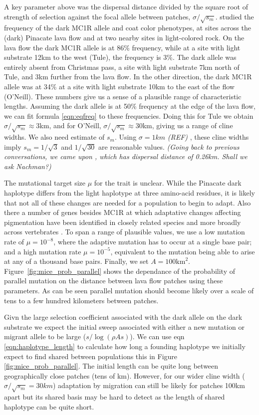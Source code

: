 \documentclass{article}
\newcommand{\gc}[1]{{\it\color{green}(#1)} }
\newcommand{\plr}[1]{{\it\color{blue}(#1)}}
\begin{document}
A key parameter above was the dispersal distance divided by the square root of strength of selection against the focal allele between patches, $\sigma/\sqrt{s_m}$. 
\citep{hoekstra2004ecological} studied the frequency of the dark MC1R allele and coat color phenotypes, 
at sites across the (dark) Pinacate lava flow and at two nearby sites in light-colored rock.
On the lava flow the dark MC1R allele is at 86\% frequency,
while at a site with light substrate 12km to the west (Tule), the frequency is 3\%.
The dark allele was entirely absent from Christmas pass, a site with light substrate 7km north of Tule, and 3km further from the lava flow.
In the other direction, the dark MC1R allele was at 34\% at a site with light substrate 10km to the east of the flow (O'Neill).
These numbers give us a sense of a plausible range of characteristic lengths.
Assuming the dark allele is at 50\% frequency at the edge of the lava flow, 
we can fit formula \eqref{eqn:eqfreq} to these frequencies.
Doing this for Tule we obtain $\sigma/\sqrt{s_m} \approx 3$km, 
and for O'Neill, $\sigma/\sqrt{s_m} \approx 30$km, giving us a range of cline widths. 
We also need estimate of $s_m$. 
Using $\sigma=1km$ \gc{REF}, these cline widths imply $s_m=1/\sqrt{3}$ and
$1/\sqrt{30}$ are reasonable values.
\plr{Going back to previous conversations, we came upon \citet{mullen2008natural}, 
which has dispersal distance of 0.26km.  Shall we ask Nachman?}

The mutational target size $\mu$ for the trait is unclear. 
While the Pinacate dark haplotype differs from the light haplotype at three amino-acid residues,
it is likely that not all of these changes are needed for a population to begin to  adapt. 
Also there a number of genes besides MC1R at which adaptative changes affecting pigmentation 
have been identified in closely related species and more broadly across vertebrates \citep{REF}.
To span a range of plausible values, we use a low mutation rate of $\mu= 10^{-8}$, 
where the adaptive mutation has to occur at a single base pair; 
and a high mutation rate $\mu= 10^{-5}$, equivalent to the mutation
being able to arise at any of a thousand base pairs.  
Finally, we set $A=100\text{km}^2$.
Figure~\ref{fig:mice_prob_parallel} shows the dependance of the probability
of parallel mutation on the distance between lava flow patches using these parameters. 
As can be seen parallel mutation should become
likely over a scale of tens to a few hundred kilometers between patches. 

Givn the large selection coefficient associated with the dark allele
on the dark substrate we expect the initial sweep associated with
either a new mutation or migrant allele to be large ($s/\log(\rho A
s)$). We can use eqn \eqref{eqn:haplotype_length} to calculate how long a
founding haplotype we initially expect to find shared between populations
this in Figure \ref{fig:mice_prob_parallel}. The initial length can be
quite long between geographically close patches (tens of km). However,
for our wider cline width ($\sigma/\sqrt{s_m} =30km$) adaptation by
migration can still be likely for patches 100km apart but its shared
basis may be hard to detect as the length of shared haplotype can be
quite short. 
\end{document}
